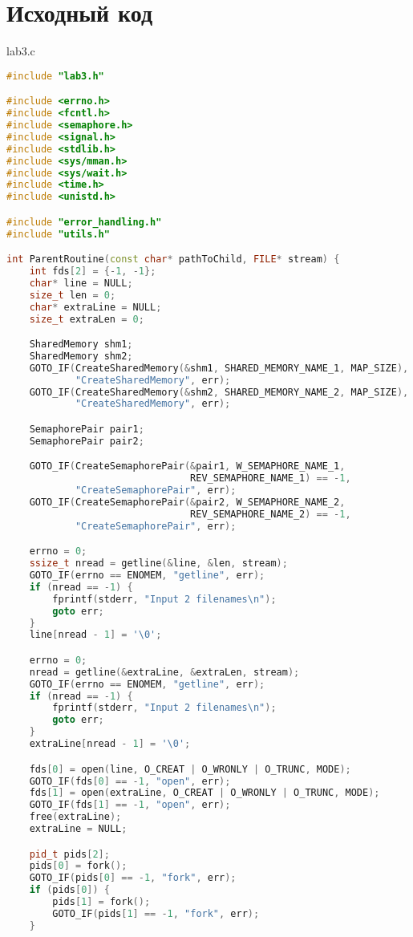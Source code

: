 \documentclass[a4paper, 12pt]{article}
\begin{document}
\newpage

\section{Исходный код}
lab3.c
\begin{lstlisting}[language=C++]
#include "lab3.h"

#include <errno.h>
#include <fcntl.h>
#include <semaphore.h>
#include <signal.h>
#include <stdlib.h>
#include <sys/mman.h>
#include <sys/wait.h>
#include <time.h>
#include <unistd.h>

#include "error_handling.h"
#include "utils.h"

int ParentRoutine(const char* pathToChild, FILE* stream) {
    int fds[2] = {-1, -1};
    char* line = NULL;
    size_t len = 0;
    char* extraLine = NULL;
    size_t extraLen = 0;

    SharedMemory shm1;
    SharedMemory shm2;
    GOTO_IF(CreateSharedMemory(&shm1, SHARED_MEMORY_NAME_1, MAP_SIZE),
            "CreateSharedMemory", err);
    GOTO_IF(CreateSharedMemory(&shm2, SHARED_MEMORY_NAME_2, MAP_SIZE),
            "CreateSharedMemory", err);

    SemaphorePair pair1;
    SemaphorePair pair2;

    GOTO_IF(CreateSemaphorePair(&pair1, W_SEMAPHORE_NAME_1,
                                REV_SEMAPHORE_NAME_1) == -1,
            "CreateSemaphorePair", err);
    GOTO_IF(CreateSemaphorePair(&pair2, W_SEMAPHORE_NAME_2,
                                REV_SEMAPHORE_NAME_2) == -1,
            "CreateSemaphorePair", err);

    errno = 0;
    ssize_t nread = getline(&line, &len, stream);
    GOTO_IF(errno == ENOMEM, "getline", err);
    if (nread == -1) {
        fprintf(stderr, "Input 2 filenames\n");
        goto err;
    }
    line[nread - 1] = '\0';

    errno = 0;
    nread = getline(&extraLine, &extraLen, stream);
    GOTO_IF(errno == ENOMEM, "getline", err);
    if (nread == -1) {
        fprintf(stderr, "Input 2 filenames\n");
        goto err;
    }
    extraLine[nread - 1] = '\0';

    fds[0] = open(line, O_CREAT | O_WRONLY | O_TRUNC, MODE);
    GOTO_IF(fds[0] == -1, "open", err);
    fds[1] = open(extraLine, O_CREAT | O_WRONLY | O_TRUNC, MODE);
    GOTO_IF(fds[1] == -1, "open", err);
    free(extraLine);
    extraLine = NULL;

    pid_t pids[2];
    pids[0] = fork();
    GOTO_IF(pids[0] == -1, "fork", err);
    if (pids[0]) {
        pids[1] = fork();
        GOTO_IF(pids[1] == -1, "fork", err);
    }


\end{lstlisting}
\end{document}
